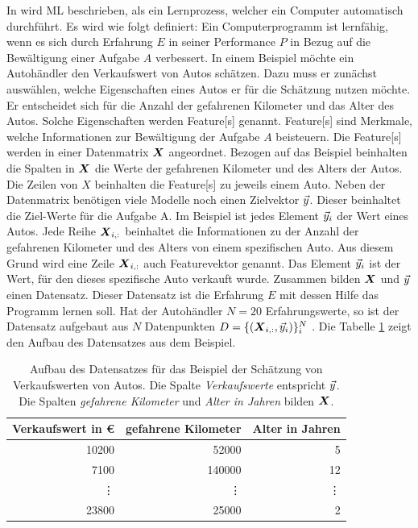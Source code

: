 In \cite{Mitchell.1997} wird \gls{ML} beschrieben, als ein Lernprozess, welcher ein Computer automatisch durchführt. Es wird wie folgt definiert: Ein Computerprogramm ist lernfähig, wenn es sich durch Erfahrung \(E\) in seiner Performance \(P\) in Bezug auf die Bewältigung einer Aufgabe \(A\) verbessert. In einem Beispiel möchte ein Autohändler den Verkaufswert von Autos schätzen. Dazu muss er zunächst auswählen, welche Eigenschaften eines Autos er für die Schätzung nutzen möchte. Er entscheidet sich für die Anzahl der gefahrenen Kilometer und das Alter des Autos. Solche Eigenschaften werden \gls{Feature}[s] genannt. \gls{Feature}[s] sind Merkmale, welche Informationen zur Bewältigung der Aufgabe \(A\) beisteuern. Die \gls{Feature}[s] werden in einer \gls{Datenmatrix} \(\boldsymbol{X}\) angeordnet. Bezogen auf das Beispiel beinhalten die Spalten in \(\boldsymbol{X}\) die Werte der gefahrenen Kilometer und des Alters der Autos. Die Zeilen von \(X\) beinhalten die \gls{Feature}[s] zu jeweils einem Auto. Neben der \gls{Datenmatrix} benötigen viele Modelle noch einen \gls{Zielvektor} \(\vec{y}\). Dieser beinhaltet die Ziel-Werte für die Aufgabe A. Im Beispiel ist jedes Element \(\vec{y}_i\) der Wert eines Autos. Jede Reihe \(\boldsymbol{X}_{i,:}\) beinhaltet die Informationen zu der Anzahl der gefahrenen Kilometer und des Alters von einem spezifischen Auto. Aus diesem Grund wird eine Zeile \(\boldsymbol{X}_{i,:}\) auch \gls{Featurevektor} genannt. Das Element \(\vec{y}_i\) ist der Wert, für den dieses spezifische Auto verkauft wurde. Zusammen bilden \(\boldsymbol{X}\) und \(\vec{y}\) einen Datensatz. Dieser Datensatz ist die Erfahrung \(E\) mit dessen Hilfe das Programm lernen soll. Hat der Autohändler \(N=20\) Erfahrungswerte, so ist der Datensatz aufgebaut aus \(N\) Datenpunkten \(D = \{(\boldsymbol{X}_{i,:}, \vec{y}_i)\}_{i}^{N}\) \cite{Goodfellow.2016, Burkov.2019, ShalevShwartz.2014}. Die Tabelle \ref{tab:BspMLAuto} zeigt den Aufbau des Datensatzes aus dem Beispiel. 


\begin{table}
    \centering
    \begin{tabular}{|r|r|r|}
     \hline
        Verkaufswert in €   & gefahrene Kilometer   & Alter in Jahren\\
     \hline
        10200               & 52000                 & 5             \\
     \hline
        7100                & 140000                & 12            \\
     \hline
        \vdots              & \vdots                & \vdots        \\
     \hline
         23800              & 25000                 & 2             \\
      \hline
    \end{tabular}
    \caption{Aufbau des Datensatzes für das Beispiel der Schätzung von Verkaufswerten von Autos. Die Spalte \textit{Verkaufswerte} entspricht \(\vec{y}\). Die Spalten \textit{gefahrene Kilometer} und \textit{Alter in Jahren} bilden \(\boldsymbol{X}\). }
    \label{tab:BspMLAuto}
\end{table}

